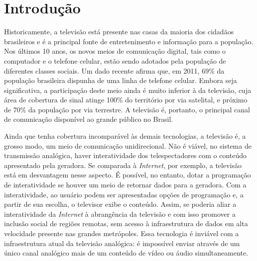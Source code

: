 \documentclass[
	12pt,				%
	openright,			%
	twoside,			%
	a4paper,			%
	english,			%
	french,				%
	brazil				%
	]{abntex2}
\begin{document}
\tableofcontents*
\cleardoublepage



\textual

\chapter*[Introdução]{Introdução}

Historicamente, a televisão está presente nas casas da maioria dos cidadãos brasileiros e é a principal fonte de
entretenimento e informação para a população. Nos últimos 10 anos, os novos meios de comunicação digital, tais
como o computador e o telefone celular, estão sendo adotados pela população de diferentes classes sociais. Um
dado recente\cite{pnad2011} afirma que, em 2011, 69\% da população brasileira dispunha de uma linha de 
telefone celular. Embora seja significativa, a participação deste meio ainda é muito inferior à da televisão,
cuja área de cobertura de sinal atinge 100\% do território por via satelital, e próximo de
70\% da população por via terrestre. A televisão é, portanto, o principal canal de comunicação disponível ao 
grande público no Brasil.

Ainda que tenha cobertura incomparável às demais tecnologias, a televisão é, a grosso modo, um meio de comunicação
unidirecional. Não é viável, no sistema de transmissão analógica, haver interatividade dos
telespectadores com o conteúdo apresentado pela geradora. Se comparada à \textit{Internet}, por exemplo, a televisão
está em desvantagem nesse aspecto. É possível, no entanto, dotar a programação de interatividade se houver um meio de
retornar dados para a geradora. Com a interatividade, ao usuário podem ser apresentadas opções de programação e, 
a partir de sua escolha, o televisor exibe o conteúdo. Assim, se poderia aliar a interatividade da \textit{Internet}
à abrangência da televisão e com isso promover a inclusão social de regiões remotas, sem acesso à infraestrutura 
de dados em alta velocidade presente nas grandes metrópoles. Essa tecnologia é inviável com a infraestrutura atual
da televisão analógica: é impossível enviar através de um único canal analógico mais de um conteúdo de vídeo ou
áudio simultaneamente.
\end{document}
